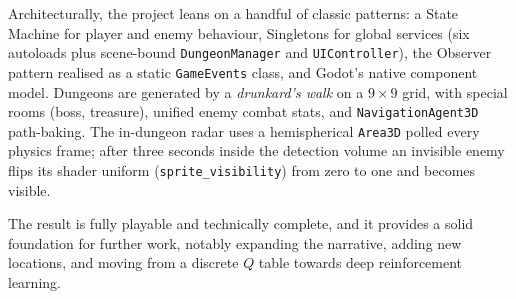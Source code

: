 Architecturally, the project leans on a handful of classic patterns: a State Machine for player and enemy behaviour, Singletons for global services (six autoloads plus scene-bound \texttt{DungeonManager} and \texttt{UIController}), the Observer pattern realised as a static \texttt{GameEvents} class, and Godot's native component model. Dungeons are generated by a \textit{drunkard's walk} on a $9 \times 9$ grid, with special rooms (boss, treasure), unified enemy combat stats, and \texttt{NavigationAgent3D} path-baking. The in-dungeon radar uses a hemispherical \texttt{Area3D} polled every physics frame; after three seconds inside the detection volume an invisible enemy flips its shader uniform (\texttt{sprite\_visibility}) from zero to one and becomes visible.

The result is fully playable and technically complete, and it provides a solid foundation for further work, notably expanding the narrative, adding new locations, and moving from a discrete $Q$ table towards deep reinforcement learning.

\cleardoublepage
